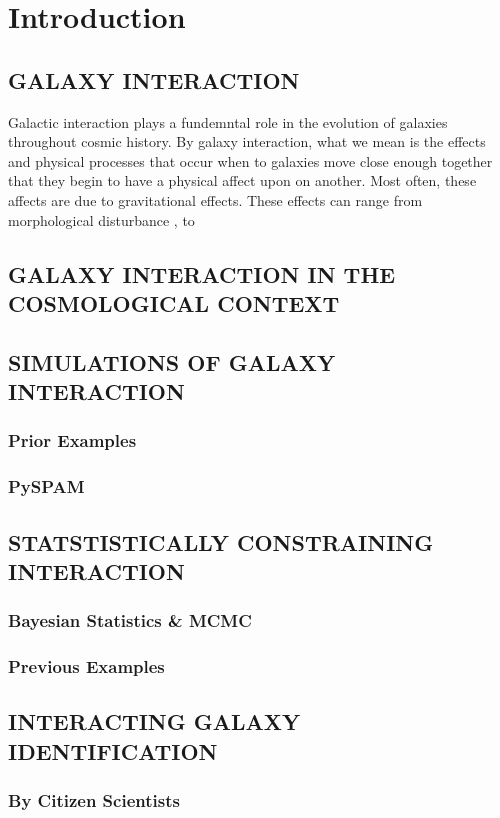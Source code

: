 \chapter{Introduction}
\section{GALAXY INTERACTION}
Galactic interaction plays a fundemntal role in the evolution of galaxies throughout cosmic history. By galaxy interaction, what we mean is the effects and physical processes that occur when to galaxies move close enough together that they begin to have a physical affect upon on another. Most often, these affects are due to gravitational effects. These effects can range from morphological disturbance \citep{}, to 

\section{GALAXY INTERACTION IN THE COSMOLOGICAL CONTEXT}
\section{SIMULATIONS OF GALAXY INTERACTION}
\subsection{Prior Examples}
\subsection{PySPAM}
\section{STATSTISTICALLY CONSTRAINING INTERACTION}
\subsection{Bayesian Statistics \& MCMC}
\subsection{Previous Examples}
\section{INTERACTING GALAXY IDENTIFICATION}
\subsection{By Citizen Scientists}
